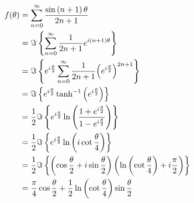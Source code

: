\item

\begin{align*}
	f(\theta)
	&= \sum_{n = 0}^\infty \frac{\sin \left(n + 1\right) \theta}{2n + 1} \\
	&= \Im \left\{ \sum_{n = 0}^\infty \frac{1}{2n + 1} e^{i (n + 1) \theta} \right\} \\
	&= \Im \left\{ e^{i \frac{\theta}{2}} \sum_{n = 0}^\infty \frac{1}{2n + 1} {\left( e^{i \frac{\theta}{2}} \right)}^{2n + 1} \right\} \\
	&= \Im \left\{ e^{i \frac{\theta}{2}} \tanh^{-1} \left( e^{i \frac{\theta}{2}} \right) \right\} \\
	&= \frac{1}{2} \Im \left\{ e^{i \frac{\theta}{2}} \ln \left( \frac{1 + e^{i \frac{\theta}{2}}}{1 - e^{i \frac{\theta}{2}}} \right) \right\} \\
	&= \frac{1}{2} \Im \left\{ e^{i \frac{\theta}{2}} \ln \left( i \cot \frac{\theta}{4} \right) \right\} \\
	&= \frac{1}{2} \Im \left\{ \left( \cos \frac{\theta}{2} + i \sin \frac{\theta}{2} \right) \left( \ln \left( \cot \frac{\theta}{4} \right) + i \frac{\pi}{2} \right) \right\} \\
	&= \frac{\pi}{4} \cos \frac{\theta}{2} + \frac{1}{2} \ln \left( \cot \frac{\theta}{4} \right) \sin \frac{\theta}{2}
\end{align*}
